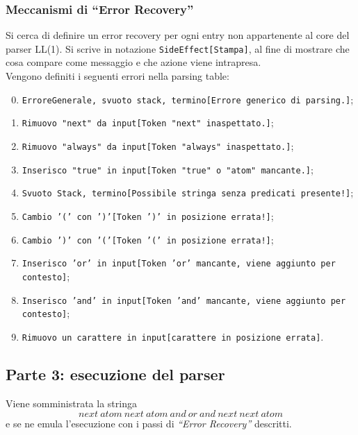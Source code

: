 \documentclass[a4paper,italian]{article}
\begin{document}
\subsubsection*{Meccanismi di ``Error Recovery''}
Si cerca di definire un error recovery per ogni entry non appartenente al core del parser LL(1). Si scrive in notazione \texttt{SideEffect[Stampa]}, al fine di
mostrare che cosa compare come messaggio e che azione viene intrapresa.\\
Vengono definiti i seguenti errori nella parsing table:
\begin{enumerate}\setcounter{enumi}{-1}
	\item \texttt{ErroreGenerale, svuoto stack, termino[Errore generico di parsing.]};
	\item \texttt{Rimuovo "next" da input[Token "next" inaspettato.]};
	\item \texttt{Rimuovo "always" da input[Token "always" inaspettato.]};
	\item \texttt{Inserisco "true" in input[Token "true" o "atom" mancante.]};
	\item \texttt{Svuoto Stack, termino[Possibile stringa senza predicati presente!]};
	\item \texttt{Cambio '(' con ')'[Token ')' in posizione errata!]};
	\item \texttt{Cambio ')' con '('[Token '(' in posizione errata!]};
	\item \texttt{Inserisco 'or' in input[Token 'or' mancante, viene aggiunto per contesto]};
	\item \texttt{Inserisco 'and' in input[Token 'and' mancante, viene aggiunto per contesto]};
	\item \texttt{Rimuovo un carattere in input[carattere in posizione errata]}.
\end{enumerate}

\subsection*{Parte 3: esecuzione del parser}
Viene somministrata la stringa
$$
	next\ atom\ next\ atom\ and\ or\ and\ next\ next\ atom
$$
e se ne emula l'esecuzione con i passi di \textit{``Error Recovery''} descritti.
\end{document}
